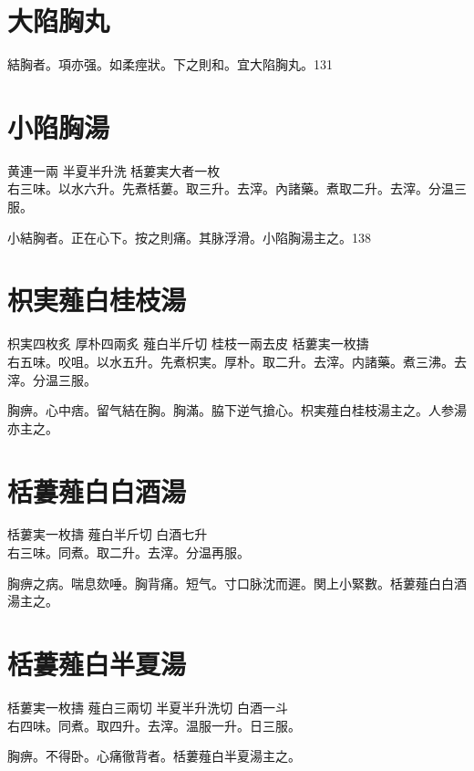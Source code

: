 \section{大陷胸丸}

結胸者。項亦强。如柔痙狀。下之則和。宜大陷胸丸。131

\section{小陷胸湯}

黄連{\scriptsize 一兩} 半夏{\scriptsize 半升洗} 栝蔞実{\scriptsize 大者一枚}\\
右三味。以水六升。先煮栝蔞。取三升。去滓。內諸藥。煮取二升。去滓。分温三服。

小結胸者。正在心下。按之則痛。其脉浮滑。小陷胸湯主之。138

\section{枳実薤白桂枝湯}

枳実{\scriptsize 四枚炙} 厚朴{\scriptsize 四兩炙} 薤白{\scriptsize 半斤切} 桂枝{\scriptsize 一兩去皮} 栝蔞実{\scriptsize 一枚擣}\\
右五味。㕮咀。以水五升。先煮枳実。厚朴。取二升。去滓。内諸藥。煮三沸。去滓。分温三服。

胸痹。心中痞。留气結在胸。胸滿。脇下逆{\khaaitp 气}搶心。枳実薤白桂枝湯主之。人参湯亦主之。

\section{栝蔞薤白白酒湯}

栝蔞実{\scriptsize 一枚擣} 薤白{\scriptsize 半斤切} 白酒{\scriptsize 七升}\\
右三味。同煮。取二升。去滓。分温再服。

胸痹之病。喘息欬唾。胸背痛。短气。寸口脉沈而遲。関上小緊數。栝蔞薤白白酒湯主之。

\section{栝蔞薤白半夏湯}

栝蔞実{\scriptsize 一枚擣} 薤白{\scriptsize 三兩切} 半夏{\scriptsize 半升洗切} 白酒{\scriptsize 一斗}\\
右四味。同煮。取四升。去滓。温服一升。日三服。

胸痹。不得卧。心痛徹背者。栝蔞薤白半夏湯主之。

